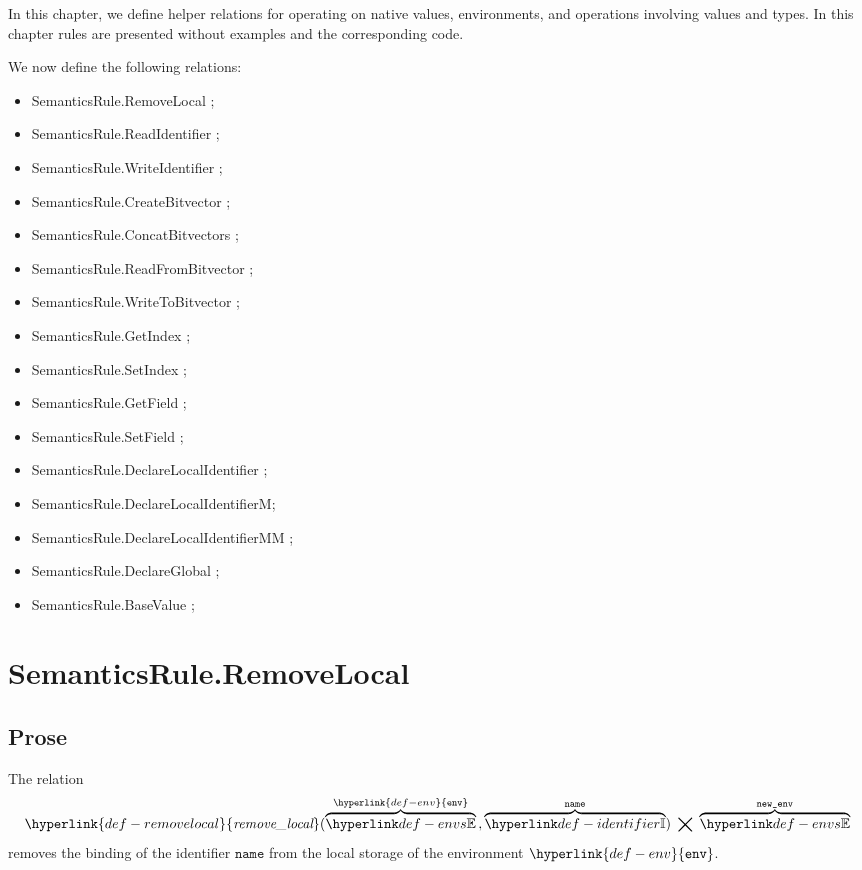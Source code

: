 \documentclass{book}
\newcommand\removelocal[0]{\hyperlink{def-removelocal}{\textfunc{remove\_local}}}
\newcommand\env[0]{\hyperlink{def-env}{\texttt{env}}}
\newcommand\name[0]{\texttt{name}}
\begin{document}
In this chapter, we define helper relations for operating on native values,
environments, and operations involving values and types.
%
In this chapter rules are presented without examples and the corresponding code.

We now define the following relations:
\begin{itemize}
  \item SemanticsRule.RemoveLocal ;
  \item SemanticsRule.ReadIdentifier ;
  \item SemanticsRule.WriteIdentifier ;
  \item SemanticsRule.CreateBitvector ;
  \item SemanticsRule.ConcatBitvectors ;
  \item SemanticsRule.ReadFromBitvector ;
  \item SemanticsRule.WriteToBitvector ;
  \item SemanticsRule.GetIndex ;
  \item SemanticsRule.SetIndex ;
  \item SemanticsRule.GetField ;
  \item SemanticsRule.SetField ;
  \item SemanticsRule.DeclareLocalIdentifier ;
  \item SemanticsRule.DeclareLocalIdentifierM;
  \item SemanticsRule.DeclareLocalIdentifierMM ;
  \item SemanticsRule.DeclareGlobal ;
  \item SemanticsRule.BaseValue ;
\end{itemize}

\section{SemanticsRule.RemoveLocal \label{sec:SemanticsRule.RemoveLocal}}
\subsection{Prose}
The relation
\hypertarget{def-removelocal}{}
\[
  \removelocal(\overname{\envs}{\env} \aslsep \overname{\Identifiers}{\name}) \;\aslrel\; \overname{\envs}{\newenv}
\]
removes the binding of the identifier $\name$ from the local storage of the environment $\env$.
\end{document}
